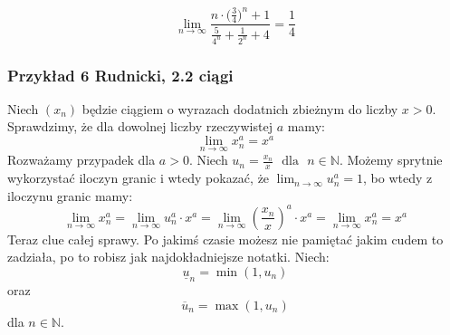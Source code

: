 \documentclass[a4paper,oneside,openright,11pt]{article}
\numberwithin{equation}{section}
\begin{document}
\begin{equation*}
    \lim_{n\to\infty} \frac{n \cdot \Big(\frac{3}{4} \Big)^{n} + 1}{\frac{5}{4^n} + \frac{1}{2^n} + 4} = \frac{1}{4}
\end{equation*}

\subsubsection{Przykład 6 Rudnicki, 2.2 ciągi}

Niech $(x_n)$ będzie ciągiem o wyrazach dodatnich zbieżnym do liczby $x > 0$. Sprawdzimy, że dla dowolnej liczby rzeczywistej $a$ mamy:
%
\begin{equation}
    \lim_{n\to\infty} x_{n}^{a} = x^{a}
\end{equation}
%
Rozważamy przypadek dla $a > 0$. Niech $u_n = \frac{x_n}{x} \ \ \ \mbox{dla} \ \ \ n \in \mathbb{N}$. Możemy sprytnie wykorzystać iloczyn granic i wtedy pokazać, że
$\lim_{n\to\infty} u_{n}^{a} = 1$, bo wtedy z iloczynu granic mamy:
%
\begin{equation*}
    \lim_{n\to\infty} x_{n}^a = \lim_{n\to\infty} u_{n}^a \cdot x^a = \lim_{n\to\infty} (\frac{x_n}{x})^{a} \cdot x^a = \lim_{n\to\infty} x_{n}^{a} = x^a
\end{equation*}
%
Teraz clue całej sprawy. Po jakimś czasie możesz nie pamiętać jakim cudem to zadziała, po to robisz jak najdokładniejsze notatki. Niech:
%
\begin{equation*}
    \underline{u}_n = \min(1, u_n)
\end{equation*}
%
oraz
%
\begin{equation*}
    \overline{u}_n = \max(1, u_n)
\end{equation*}
%
dla $n \in \mathbb{N}$.
\end{document}
